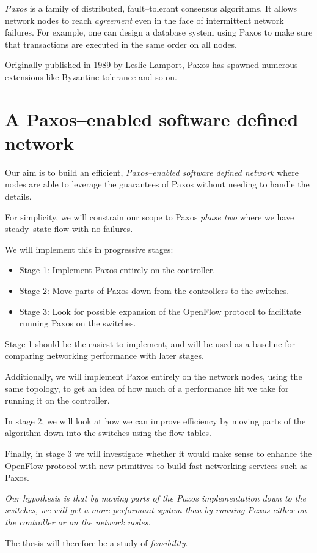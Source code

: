 {\em Paxos} is a family of distributed, fault--tolerant consensus
algorithms.  It allows network nodes to reach {\em agreement} even in the
face of intermittent network failures.  For example, one can design a
database system using Paxos to make sure that transactions are executed in
the same order on all nodes.

Originally published in 1989 by Leslie
Lamport\cite{Lamport:1998:PP:279227.279229}, Paxos has spawned numerous
extensions like Byzantine tolerance and so on.

\section{A Paxos--enabled software defined network}

Our aim is to build an efficient, {\em Paxos--enabled software defined
network} where nodes are able to leverage the guarantees of Paxos without
needing to handle the details.

For simplicity, we will constrain our scope to Paxos {\em phase two} where
we have steady--state flow with no failures.

We will implement this in progressive stages:

\begin{itemize}
\item Stage 1: Implement Paxos entirely on the controller.
\item Stage 2: Move parts of Paxos down from the controllers to the
switches.
\item Stage 3: Look for possible expansion of the OpenFlow protocol to
facilitate running Paxos on the switches.
\end{itemize}

Stage 1 should be the easiest to implement, and will be used as a baseline
for comparing networking performance with later stages.

Additionally, we will implement Paxos entirely on the network nodes, using
the same topology, to get an idea of how much of a performance hit we take
for running it on the controller.

In stage 2, we will look at how we can improve efficiency by moving parts of
the algorithm down into the switches using the flow tables.

Finally, in stage 3 we will investigate whether it would make sense to
enhance the OpenFlow protocol with new primitives to build fast
networking services such as Paxos.

{\em 
  Our hypothesis is that by moving parts of the Paxos implementation down to
  the switches, we will get a more performant system than by running Paxos
  either on the controller or on the network nodes.
}

The thesis will therefore be a study of {\em feasibility}.
